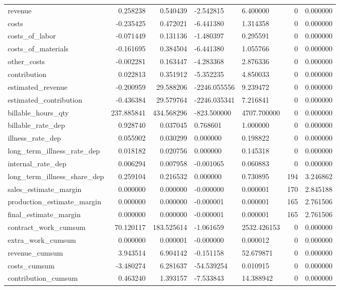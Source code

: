 \begin{landscape}
\begin{longtable}[h!]{lrrllrr}
revenue & 0.258238 & 0.540439 & -2.542815 & 6.400000 & 0 & 0.000000 \\
costs & -0.235425 & 0.472021 & -6.441380 & 1.314358 & 0 & 0.000000 \\
costs_of_labor & -0.071449 & 0.131136 & -1.480397 & 0.295591 & 0 & 0.000000 \\
costs_of_materials & -0.161695 & 0.384504 & -6.441380 & 1.055766 & 0 & 0.000000 \\
other_costs & -0.002281 & 0.163447 & -4.283368 & 2.876336 & 0 & 0.000000 \\
contribution & 0.022813 & 0.351912 & -5.352235 & 4.850033 & 0 & 0.000000 \\
estimated_revenue & -0.200959 & 29.588206 & -2246.055556 & 9.239472 & 0 & 0.000000 \\
estimated_contribution & -0.436384 & 29.579764 & -2246.035341 & 7.216841 & 0 & 0.000000 \\
billable_hours_qty & 237.885841 & 434.568296 & -823.500000 & 4707.700000 & 0 & 0.000000 \\
billable_rate_dep & 0.928740 & 0.037045 & 0.768601 & 1.000000 & 0 & 0.000000 \\
illness_rate_dep & 0.055902 & 0.030299 & 0.000000 & 0.198822 & 0 & 0.000000 \\
long_term_illness_rate_dep & 0.018182 & 0.020756 & 0.000000 & 0.145318 & 0 & 0.000000 \\
internal_rate_dep & 0.006294 & 0.007958 & -0.001065 & 0.060883 & 0 & 0.000000 \\
long_term_illness_share_dep & 0.259104 & 0.216532 & 0.000000 & 0.730895 & 194 & 3.246862 \\
sales_estimate_margin & 0.000000 & 0.000000 & -0.000000 & 0.000001 & 170 & 2.845188 \\
production_estimate_margin & 0.000000 & 0.000000 & -0.000001 & 0.000001 & 165 & 2.761506 \\
final_estimate_margin & 0.000000 & 0.000000 & -0.000001 & 0.000001 & 165 & 2.761506 \\
contract_work_cumsum & 70.120117 & 183.525614 & -1.061659 & 2532.426153 & 0 & 0.000000 \\
extra_work_cumsum & 0.000000 & 0.000001 & -0.000000 & 0.000012 & 0 & 0.000000 \\
revenue_cumsum & 3.943514 & 6.904142 & -0.151158 & 52.679871 & 0 & 0.000000 \\
costs_cumsum & -3.480274 & 6.281637 & -54.539254 & 0.010915 & 0 & 0.000000 \\
contribution_cumsum & 0.463240 & 1.393157 & -7.533843 & 14.388942 & 0 & 0.000000 \\

\end{longtable}
\end{landscape}
